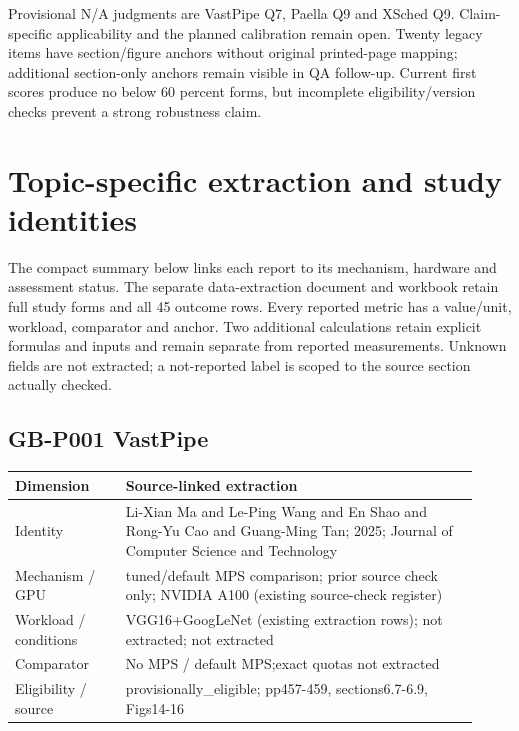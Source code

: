 \documentclass[12pt,a4paper]{article}
\begin{document}
Provisional N/\allowbreak{}A judgments are VastPipe Q7, Paella Q9 and XSched Q9. Claim-specific applicability and the planned calibration remain open. Twenty legacy items have section/\allowbreak{}figure anchors without original printed-page mapping; additional section-only anchors remain visible in QA follow-up. Current first scores produce no below 60 percent forms, but incomplete eligibility/\allowbreak{}version checks prevent a strong robustness claim.



\section{Topic-specific extraction and study identities}

The compact summary below links each report to its mechanism, hardware and assessment status. The separate data-extraction document and workbook retain full study forms and all 45 outcome rows. Every reported metric has a value/\allowbreak{}unit, workload, comparator and anchor. Two additional calculations retain explicit formulas and inputs and remain separate from reported measurements. Unknown fields are not extracted; a not-reported label is scoped to the source section actually checked.


\subsection*{GB-P001 VastPipe}
\cite{GB-P001}

{\small\begin{longtable}{>{\raggedright\arraybackslash}p{0.22\linewidth}>{\raggedright\arraybackslash}p{0.7\linewidth}}
\toprule
Dimension & Source-linked extraction\\\midrule
\endhead
Identity & Li-Xian Ma and Le-Ping Wang and En Shao and Rong-Yu Cao and Guang-Ming Tan; 2025; Journal of Computer Science and Technology\\
Mechanism /\allowbreak{} GPU & tuned/\allowbreak{}default MPS comparison; prior source check only; NVIDIA A100 (existing source-check register)\\
Workload /\allowbreak{} conditions & VGG16+GoogLeNet (existing extraction rows); not extracted; not extracted\\
Comparator & No MPS /\allowbreak{} default MPS;exact quotas not extracted\\
Eligibility /\allowbreak{} source & provisionally\_\allowbreak{}eligible; pp457-459, sections6.7-6.9, Figs14-16\\
\bottomrule
\end{longtable}}
\end{document}
